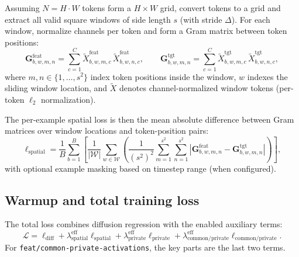\documentclass[11pt]{article}
\begin{document}
Assuming $N=H\cdot W$ tokens form a $H\times W$ grid, convert tokens to a grid and extract all valid square windows of side length $s$ (with stride $\Delta$). For each window, normalize channels per token and form a Gram matrix between token positions:
\[
  \bm{G}^{\text{feat}}_{b,w,m,n}
  =
  \sum_{c=1}^{C}
  \tilde{X}^{\text{feat}}_{b,w,m,c}\,\tilde{X}^{\text{feat}}_{b,w,n,c},
  \qquad
  \bm{G}^{\text{tgt}}_{b,w,m,n}
  =
  \sum_{c=1}^{C}
  \tilde{X}^{\text{tgt}}_{b,w,m,c}\,\tilde{X}^{\text{tgt}}_{b,w,n,c},
  \]
where $m,n\in\{1,\dots,s^2\}$ index token positions inside the window, $w$ indexes the sliding window location, and $\tilde{X}$ denotes channel-normalized window tokens (per-token $\ell_2$ normalization).

The per-example spatial loss is then the mean absolute difference between Gram matrices over window locations and token-position pairs:
\[
  \ell_{\text{spatial}}
  =
  \frac{1}{B}\sum_{b=1}^{B}
  \left[
    \frac{1}{|\mathcal{W}|}\sum_{w\in\mathcal{W}}
    \left(
      \frac{1}{(s^2)^2}\sum_{m=1}^{s^2}\sum_{n=1}^{s^2}
      \left|
        \bm{G}^{\text{feat}}_{b,w,m,n}
        -
        \bm{G}^{\text{tgt}}_{b,w,m,n}
      \right|
    \right)
  \right],
 \]
with optional example masking based on timestep range (when configured).

\subsection*{Warmup and total training loss}
The total loss combines diffusion regression with the enabled auxiliary terms:
\[
  \mathcal{L}
  = \ell_{\text{diff}}
  + \lambda_{\text{spatial}}^{\text{eff}}\ell_{\text{spatial}}
  + \lambda_{\text{private}}^{\text{eff}}\ell_{\text{private}}
  + \lambda_{\text{common/private}}^{\text{eff}}\ell_{\text{common/private}}.
 \]
For \texttt{feat/common-private-activations}, the key parts are the last two terms.
\end{document}
